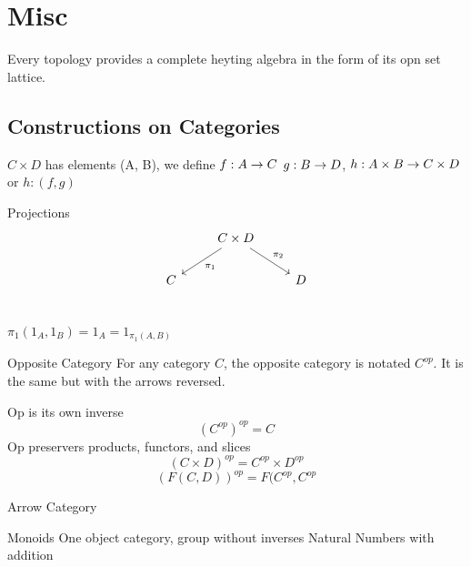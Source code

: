 \documentclass[../notes.tex]{subfiles}
\begin{document}
\section{Misc}

Every topology provides a complete heyting algebra in the form of its opn set lattice.

\subsection{Constructions on Categories}

$C \times D$  has elements (A, B), we define
$ f : A \rightarrow C $
$ g : B \rightarrow D $,
$ h : A \times B \rightarrow C \times D $ or $ h : (f, g) $




Projections
\[
  \begin{tikzcd}
    & C \times D \arrow[dl, "\pi_1"] \arrow[dr, "\pi_2"] &   \\
    C  &  & D \\
  \end{tikzcd}
\]

$\pi_1( 1_A, 1_B )= 1_A = 1_{\pi_1(A, B)} $

Opposite Category
For any category $C$, the opposite category is notated $C^{op}$.
It is the same but with the arrows reversed.

Op is its own inverse
$$ (C^{op})^{op} = C $$
Op preservers products, functors, and slices %
$$ (C \times D)^{op} = C^{op} \times D^{op} $$
$$ (F(C,D))^{op} = F(C^{op}, C^{op} $$

Arrow Category

\begin{definition}
  Monoids
  One object category, group without inverses
  Natural Numbers with addition
\end{definition}
\end{document}
